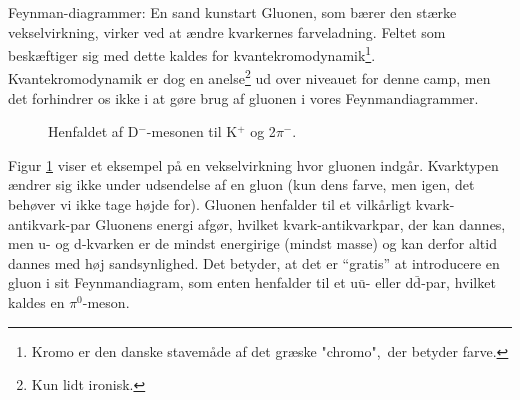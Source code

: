 \begin{opgave}{Feynman-diagrammer: En sand kunstart} \label{opg:feynman1}
    Gluonen, som bærer den stærke vekselvirkning, virker ved at ændre kvarkernes farveladning. Feltet som beskæftiger sig med dette kaldes for kvantekromodynamik\footnote{Kromo er den danske stavemåde af det græske "chromo",~der betyder farve.}. Kvantekromodynamik er dog en anelse\footnote{Kun lidt ironisk.} ud over niveauet for denne camp, men det forhindrer os ikke i at gøre brug af gluonen i vores Feynmandiagrammer.
    \begin{figure} [h!]
        \centering
        \caption{Henfaldet af D$^-$-mesonen til K$^+$ og 2$\pi^-$.}
        \label{fig:quark_inter}
    \end{figure}
    
    \noindent Figur \ref{fig:quark_inter} viser et eksempel på en vekselvirkning hvor gluonen indgår. Kvarktypen ændrer sig ikke under udsendelse af en gluon (kun dens farve, men igen, det behøver vi ikke tage højde for). Gluonen henfalder til et vilkårligt kvark-antikvark-par Gluonens energi afgør, hvilket kvark-antikvarkpar, der kan dannes, men u- og d-kvarken er de mindst energirige (mindst masse) og kan derfor altid dannes med høj sandsynlighed. Det betyder, at det er ``gratis''  at introducere en gluon i sit Feynmandiagram, som enten henfalder til et u$\bar{\text{u}}$- eller d$\bar{\text{d}}$-par, hvilket kaldes en $\pi^0$-meson. \\


\end{opgave}
